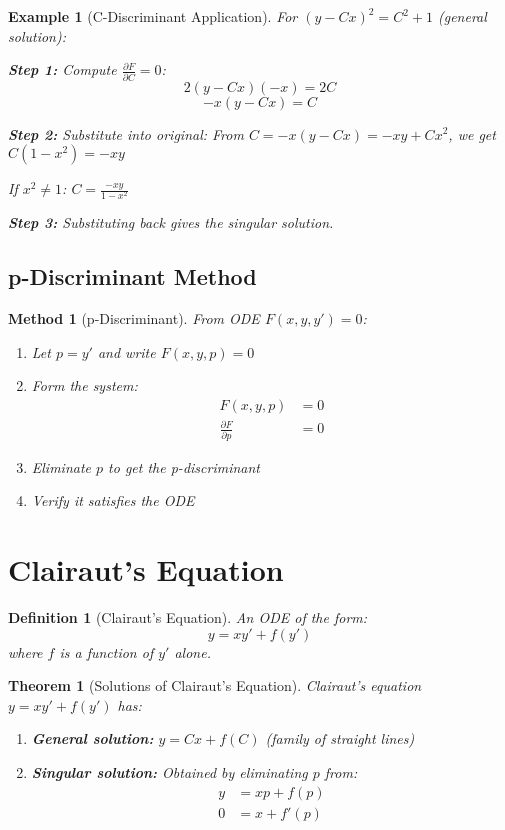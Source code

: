 \documentclass[12pt]{article}
\newtheorem{definition}{Definition}
\newtheorem{theorem}{Theorem}
\newtheorem{method}{Method}
\newtheorem{example}{Example}
\begin{document}
\begin{example}[C-Discriminant Application]
For $(y - Cx)^2 = C^2 + 1$ (general solution):

\textbf{Step 1:} Compute $\frac{\partial F}{\partial C} = 0$:
$$2(y - Cx)(-x) = 2C$$
$$-x(y - Cx) = C$$

\textbf{Step 2:} Substitute into original:
From $C = -x(y - Cx) = -xy + Cx^2$, we get $C(1 - x^2) = -xy$

If $x^2 \neq 1$: $C = \frac{-xy}{1 - x^2}$

\textbf{Step 3:} Substituting back gives the singular solution.
\end{example}

\subsection{p-Discriminant Method}

\begin{method}[p-Discriminant]
From ODE $F(x,y,y') = 0$:
\begin{enumerate}
    \item Let $p = y'$ and write $F(x,y,p) = 0$
    \item Form the system:
    \begin{align}
    F(x,y,p) &= 0\\
    \frac{\partial F}{\partial p} &= 0
    \end{align}
    \item Eliminate $p$ to get the p-discriminant
    \item Verify it satisfies the ODE
\end{enumerate}
\end{method}

\section{Clairaut's Equation}

\begin{definition}[Clairaut's Equation]
An ODE of the form:
$$y = xy' + f(y')$$
where $f$ is a function of $y'$ alone.
\end{definition}

\begin{theorem}[Solutions of Clairaut's Equation]
Clairaut's equation $y = xy' + f(y')$ has:
\begin{enumerate}
    \item \textbf{General solution:} $y = Cx + f(C)$ (family of straight lines)
    \item \textbf{Singular solution:} Obtained by eliminating $p$ from:
    \begin{align}
    y &= xp + f(p)\\
    0 &= x + f'(p)
    \end{align}
\end{enumerate}
\end{theorem}
\end{document}
